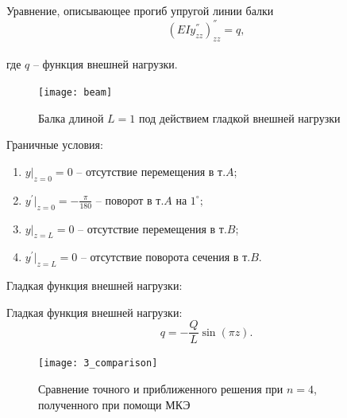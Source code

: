 \documentclass[7pt]{beamer}
\numberwithin{equation}{section}
\begin{document}
\begin{frame}{}
	\begin{block}{Уравнение, описывающее прогиб упругой линии балки}
	$$(EIy^{''}_{zz})^{''}_{zz}=q,$$\\
где  $q$ -- функция внешней нагрузки.
	\end{block}
	\begin{figure}[H]
		\centering
		\texttt{[image: beam]}
		\label{fig:beam}
		\caption{Балка длиной $L=1$ под действием гладкой внешней нагрузки}
	\end{figure}
Граничные условия:
\begin{enumerate} 
	\item $y|_{z=0}=0$ -- отсутствие перемещения в т.$A$;\\
	\item $y^{'}|_{z=0}=-\frac{\pi}{180}$ -- поворот в т.$A$ на $1^{\circ};$\\
	\item $y|_{z=L}=0$ -- отсутствие перемещения в т.$B$;\\ 
	\item $y^{'}|_{z=L}=0$ -- отсутствие поворота сечения в т.$B$.\\
\end{enumerate}
\end{frame}

\begin{frame}{Гладкая функция внешней нагрузки:}
	\begin{block}{Гладкая функция внешней нагрузки:}
		\[q=-\frac{Q}{L} \sin(\pi z).\]
	\end{block}

	\begin{figure}[H]
		\centering
		\texttt{[image: 3\_comparison]}
		\caption{Сравнение точного и приближенного решения при $n=4$, полученного при помощи МКЭ}
		\label{fig:3_comparison}
	\end{figure}
\end{frame}
\end{document}
